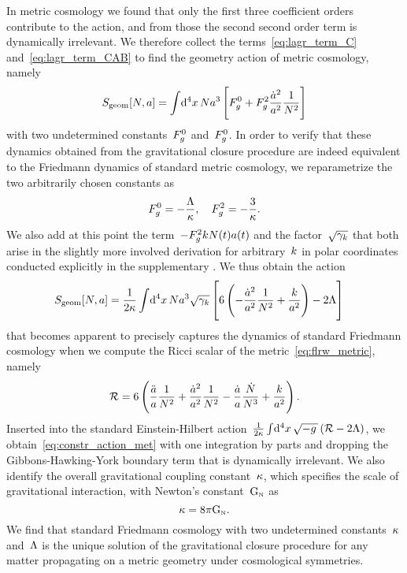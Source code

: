 In metric cosmology we found that only the first three coefficient orders contribute to the action, and from those the second second order term is dynamically irrelevant. We therefore collect the terms~\eqref{eq:lagr_term_C} and~\eqref{eq:lagr_term_CAB} to find the geometry action of metric cosmology, namely
\begin{equation}\label{eq:cosmo_met_action_raw}
	\actgeom[\Nlapse,\scalea]=\intd{^4x}\Nlapse\scalea^3\left[\Func{0}{\met}+\Func{2}{\met}\lndt[2]{\scalea}\frac{1}{\Nlapse^2}\right]
\end{equation}
with two undetermined constants~${F^{0}_{g}}$ and~${F^{0}_{g}}$. In order to verify that these dynamics obtained from the gravitational closure procedure are indeed equivalent to the Friedmann dynamics of standard \FLRW{} metric cosmology, we reparametrize the two arbitrarily chosen constants as
\begin{equation}
	{F^{0}_{g}}=-\frac{\Lambda}{\kappa}
	\mathpunct{,} \quad
	{F^{2}_{g}}=-\frac{3}{\kappa}
	\mathpunct{.}
\end{equation}
We also add at this point the term~$-{F^{2}_{g}}kN(t)a(t)$ and the factor~$\sqrt{{\gamma_{k}}}$ that both arise in the slightly more involved derivation for arbitrary~$k$ in polar coordinates conducted explicitly in the supplementary . We thus obtain the action
\begin{align}\label{eq:constr_action_met}
	\actgeom[\Nlapse,\scalea]&=\frac{1}{2\gravconst}\intd{^4\coordx}\Nlapse\scalea^3\sqrt{\spatmet}\left[6\left(-\lndt[2]{\scalea}\frac{1}{\Nlapse^2}+\frac{\spatcurv}{\scalea^2}\right)-2\cosmconst\right]
\end{align}
that becomes apparent to precisely captures the dynamics of standard Friedmann cosmology when we compute the Ricci scalar of the \FLRW{} metric~\eqref{eq:flrw_metric}, namely
\begin{equation}
	\mathcal{R}=6\left(\frac{\ddot{a}}{a}\frac{1}{N^2}+\frac{\dot{a}^2}{a^2}\frac{1}{N^2}-\frac{\dot{a}}{a}\frac{\dot{N}}{N^3}+\frac{k}{a^2}\right)
	\mathpunct{.}
\end{equation}
Inserted into the standard Einstein-Hilbert action~$\frac{1}{2\gravconst}\intd{^4x}\sqrtmet\left(\Rscal-2\cosmconst\right)$, we obtain~\eqref{eq:constr_action_met} with one integration by parts and dropping the Gibbons-Hawking-York boundary term that is dynamically irrelevant. We also identify the overall gravitational coupling constant~$\kappa$, which specifies the scale of gravitational interaction, with Newton's constant~$\mathrm{G}_\textnormal{\tiny{N}}$ as
\begin{equation}
	\kappa=8\pi\mathrm{G}_\textnormal{\tiny{N}}
	\mathpunct{.}
\end{equation}
We find that standard Friedmann cosmology with two undetermined constants~$\kappa$ and~$\Lambda$ is the unique solution of the gravitational closure procedure for any matter propagating on a metric geometry under cosmological symmetries.

